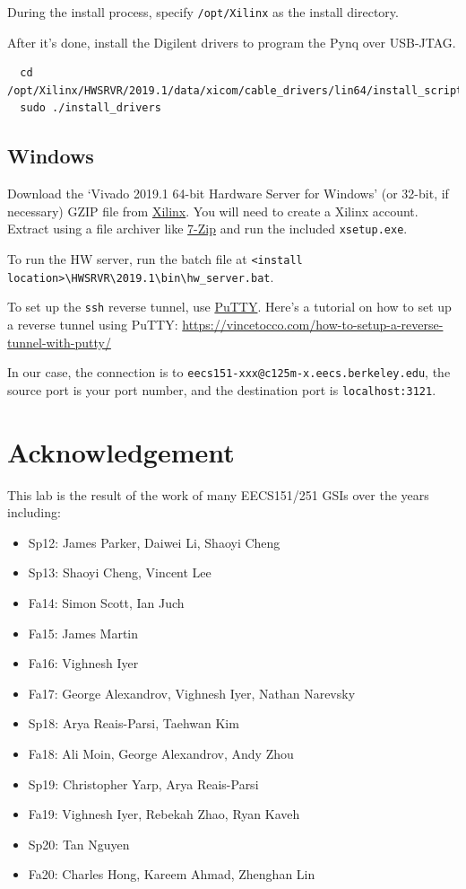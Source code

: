 \documentclass[11pt]{article}
\begin{document}
During the install process, specify \texttt{/opt/Xilinx} as the install directory.

After it's done, install the Digilent drivers to program the Pynq over USB-JTAG.
\begin{verbatim}
  cd /opt/Xilinx/HWSRVR/2019.1/data/xicom/cable_drivers/lin64/install_script/install_drivers
  sudo ./install_drivers
\end{verbatim}

\subsection{Windows}
Download the `Vivado 2019.1 64-bit Hardware Server for Windows' (or 32-bit, if necessary) GZIP file from \href{https://www.xilinx.com/support/download/index.html/content/xilinx/en/downloadNav/vivado-design-tools/archive.html}{Xilinx}.
You will need to create a Xilinx account.
Extract using a file archiver like \href{https://www.7-zip.org/}{7-Zip} and run the included \texttt{xsetup.exe}.

To run the HW server, run the batch file at \verb|<install location>\HWSRVR\2019.1\bin\hw_server.bat|.

To set up the \texttt{ssh} reverse tunnel, use \href{https://www.putty.org/}{PuTTY}.
Here's a tutorial on how to set up a reverse tunnel using PuTTY:
\url{https://vincetocco.com/how-to-setup-a-reverse-tunnel-with-putty/}

In our case, the connection is to \texttt{eecs151-xxx@c125m-x.eecs.berkeley.edu}, the source port is your port number, and the destination port is \texttt{localhost:3121}.

\section*{Acknowledgement}
This lab is the result of the work of many EECS151/251 GSIs over the years including:
\begin{itemize}
\item Sp12: James Parker, Daiwei Li, Shaoyi Cheng
\item Sp13: Shaoyi Cheng, Vincent Lee
\item Fa14: Simon Scott, Ian Juch
\item Fa15: James Martin
\item Fa16: Vighnesh Iyer
\item Fa17: George Alexandrov, Vighnesh Iyer, Nathan Narevsky
\item Sp18: Arya Reais-Parsi, Taehwan Kim
\item Fa18: Ali Moin, George Alexandrov, Andy Zhou
\item Sp19: Christopher Yarp, Arya Reais-Parsi
\item Fa19: Vighnesh Iyer, Rebekah Zhao, Ryan Kaveh
\item Sp20: Tan Nguyen
\item Fa20: Charles Hong, Kareem Ahmad, Zhenghan Lin
\end{itemize}
\end{document}
